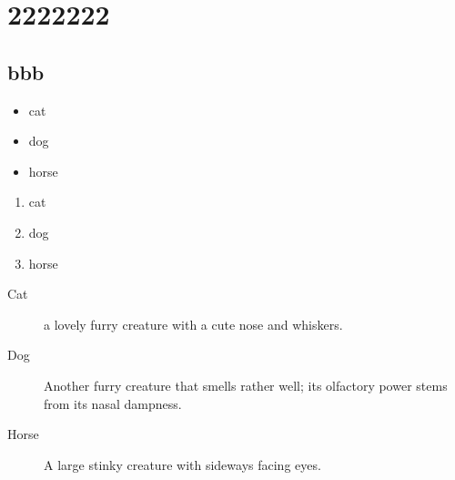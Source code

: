 \documentclass{NEWSTYLE}
\begin{document}
	


\chapter{2222222}
\section{bbb}

\begin{itemize}
	\item cat
	\item dog
	\item horse
\end{itemize}

\begin{enumerate}
	\item cat
	\item dog
	\item horse
\end{enumerate}

\begin{description}
	\item[Cat] a lovely furry creature with a cute nose and whiskers.
	\item[Dog] Another furry creature that smells rather well;
	its olfactory power stems from its nasal dampness.
	\item [Horse] A large stinky creature with sideways facing eyes.
\end{description}
\end{document}
